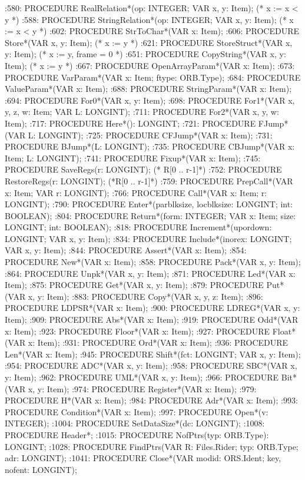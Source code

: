 :580:  PROCEDURE RealRelation*(op: INTEGER; VAR x, y: Item);   (* x := x < y *)
:588:  PROCEDURE StringRelation*(op: INTEGER; VAR x, y: Item);   (* x := x < y *)
:602:  PROCEDURE StrToChar*(VAR x: Item);
:606:  PROCEDURE Store*(VAR x, y: Item); (* x := y *)
:621:  PROCEDURE StoreStruct*(VAR x, y: Item); (* x := y, frame = 0 *)
:651:  PROCEDURE CopyString*(VAR x, y: Item);  (* x := y *) 
:667:  PROCEDURE OpenArrayParam*(VAR x: Item);
:673:  PROCEDURE VarParam*(VAR x: Item; ftype: ORB.Type);
:684:  PROCEDURE ValueParam*(VAR x: Item);
:688:  PROCEDURE StringParam*(VAR x: Item);
:694:  PROCEDURE For0*(VAR x, y: Item);
:698:  PROCEDURE For1*(VAR x, y, z, w: Item; VAR L: LONGINT);
:711:  PROCEDURE For2*(VAR x, y, w: Item);
:717:  PROCEDURE Here*(): LONGINT;
:721:  PROCEDURE FJump*(VAR L: LONGINT);
:725:  PROCEDURE CFJump*(VAR x: Item);
:731:  PROCEDURE BJump*(L: LONGINT);
:735:  PROCEDURE CBJump*(VAR x: Item; L: LONGINT);
:741:  PROCEDURE Fixup*(VAR x: Item);
:745:  PROCEDURE SaveRegs(r: LONGINT);  (* R[0 .. r-1]*)
:752:  PROCEDURE RestoreRegs(r: LONGINT); (*R[0 .. r-1]*)
:759:  PROCEDURE PrepCall*(VAR x: Item; VAR r: LONGINT);
:766:  PROCEDURE Call*(VAR x: Item; r: LONGINT);
:790:  PROCEDURE Enter*(parblksize, locblksize: LONGINT; int: BOOLEAN);
:804:  PROCEDURE Return*(form: INTEGER; VAR x: Item; size: LONGINT; int: BOOLEAN);
:818:  PROCEDURE Increment*(upordown: LONGINT; VAR x, y: Item);
:834:  PROCEDURE Include*(inorex: LONGINT; VAR x, y: Item);
:844:  PROCEDURE Assert*(VAR x: Item);
:854:  PROCEDURE New*(VAR x: Item);
:858:  PROCEDURE Pack*(VAR x, y: Item);
:864:  PROCEDURE Unpk*(VAR x, y: Item);
:871:  PROCEDURE Led*(VAR x: Item);
:875:  PROCEDURE Get*(VAR x, y: Item);
:879:  PROCEDURE Put*(VAR x, y: Item);
:883:  PROCEDURE Copy*(VAR x, y, z: Item);
:896:  PROCEDURE LDPSR*(VAR x: Item);
:900:  PROCEDURE LDREG*(VAR x, y: Item);
:909:  PROCEDURE Abs*(VAR x: Item);
:919:  PROCEDURE Odd*(VAR x: Item);
:923:  PROCEDURE Floor*(VAR x: Item);
:927:  PROCEDURE Float*(VAR x: Item);
:931:  PROCEDURE Ord*(VAR x: Item);
:936:  PROCEDURE Len*(VAR x: Item);
:945:  PROCEDURE Shift*(fct: LONGINT; VAR x, y: Item);
:954:  PROCEDURE ADC*(VAR x, y: Item);
:958:  PROCEDURE SBC*(VAR x, y: Item);
:962:  PROCEDURE UML*(VAR x, y: Item);
:966:  PROCEDURE Bit*(VAR x, y: Item);
:974:  PROCEDURE Register*(VAR x: Item);
:979:  PROCEDURE H*(VAR x: Item);
:984:  PROCEDURE Adr*(VAR x: Item);
:993:  PROCEDURE Condition*(VAR x: Item);
:997:  PROCEDURE Open*(v: INTEGER);
:1004:  PROCEDURE SetDataSize*(dc: LONGINT);
:1008:  PROCEDURE Header*;
:1015:  PROCEDURE NofPtrs(typ: ORB.Type): LONGINT;
:1028:  PROCEDURE FindPtrs(VAR R: Files.Rider; typ: ORB.Type; adr: LONGINT);
:1041:  PROCEDURE Close*(VAR modid: ORS.Ident; key, nofent: LONGINT);

